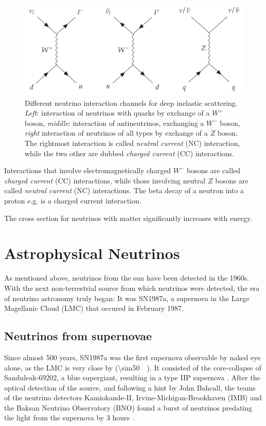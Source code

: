\documentclass[
    a4paper, %
    fontsize=10pt, %
    twoside=false, %
    numbers=noenddot, %
    fontmethod=tex,
]{kaobook}
\begin{document}
\begin{figure}[htb]
    \includegraphics{theory/neutrino_interactions_feynman.pdf}
    \caption[Neutrino interactions]{Different neutrino interaction channels for deep inelastic scattering. \textit{Left}: interaction of neutrinos with quarks by exchange of a $W^+$ boson, \textit{middle}: interaction of antineutrinos, exchanging a $W^-$ boson, \textit{right} interaction of neutrinos of all types by exchange of a $Z$ boson. The rightmost interaction is called \textit{neutral current} (NC) interaction, while the two other are dubbed \textit{charged current} (CC) interactions.} 
\end{figure}

Interactions that involve electromagnetically charged $W^-$ bosons are called \textit{charged current} (CC) interactions, while those involving neutral $Z$ bosons are called \textit{neutral current} (NC) interactions. The beta decay of a neutron into a proton e.g. is a charged current interaction.

The cross section for neutrinos with matter significantly increases with energy.

\section{Astrophysical Neutrinos}
As mentioned above, neutrinos from the sun have been detected in the 1960s. With the next non-terrestrial source from which neutrinos were detected, the era of neutrino astronomy truly began: It was SN1987a, a supernova in the Large Magellanic Cloud (LMC) that occured in February 1987. 

\subsection{Neutrinos from supernovae}
Since almost 500 years, SN1987a was the first supernova observable by naked eye alone, as the LMC is very close by (\SI{\sim50}{\kilo\parsec}). It consisted of the core-collapse of Sanduleak-69202, a blue supergiant, resulting in a type IIP supernova . After the optical detection of the source, and following a hint by John Bahcall, the teams of the neutrino detectors Kamiokande-II, Irvine-Michigan-Brookhaven (IMB) and the Baksan Neutrino Observatory (BNO) found a burst of neutrinos predating the light from the supernova by 3 hours .
\end{document}
